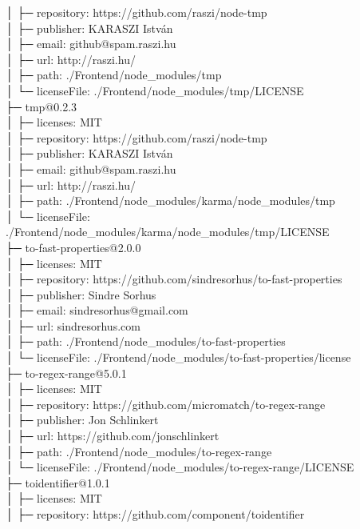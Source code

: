 │  ├─ repository: https://github.com/raszi/node-tmp\\
│  ├─ publisher: KARASZI István\\
│  ├─ email: github@spam.raszi.hu\\
│  ├─ url: http://raszi.hu/\\
│  ├─ path: ./Frontend/node\_modules/tmp\\
│  └─ licenseFile: ./Frontend/node\_modules/tmp/LICENSE\\
├─ tmp@0.2.3\\
│  ├─ licenses: MIT\\
│  ├─ repository: https://github.com/raszi/node-tmp\\
│  ├─ publisher: KARASZI István\\
│  ├─ email: github@spam.raszi.hu\\
│  ├─ url: http://raszi.hu/\\
│  ├─ path: ./Frontend/node\_modules/karma/node\_modules/tmp\\
│  └─ licenseFile: ./Frontend/node\_modules/karma/node\_modules/tmp/LICENSE\\
├─ to-fast-properties@2.0.0\\
│  ├─ licenses: MIT\\
│  ├─ repository: https://github.com/sindresorhus/to-fast-properties\\
│  ├─ publisher: Sindre Sorhus\\
│  ├─ email: sindresorhus@gmail.com\\
│  ├─ url: sindresorhus.com\\
│  ├─ path: ./Frontend/node\_modules/to-fast-properties\\
│  └─ licenseFile: ./Frontend/node\_modules/to-fast-properties/license\\
├─ to-regex-range@5.0.1\\
│  ├─ licenses: MIT\\
│  ├─ repository: https://github.com/micromatch/to-regex-range\\
│  ├─ publisher: Jon Schlinkert\\
│  ├─ url: https://github.com/jonschlinkert\\
│  ├─ path: ./Frontend/node\_modules/to-regex-range\\
│  └─ licenseFile: ./Frontend/node\_modules/to-regex-range/LICENSE\\
├─ toidentifier@1.0.1\\
│  ├─ licenses: MIT\\
│  ├─ repository: https://github.com/component/toidentifier\\
